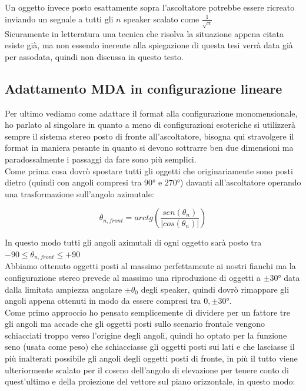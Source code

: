 \documentclass[12pt,a4paper]{report}
\begin{document}
Un oggetto invece posto esattamente sopra l'ascoltatore potrebbe essere ricreato inviando un segnale a tutti gli $n$ speaker scalato come $\frac{1}{\sqrt{n}}$\\

Sicuramente in letteratura una tecnica che risolva la situazione appena citata esiste già, ma non essendo inerente alla spiegazione di questa tesi verrà data già per assodata, quindi non discussa in questo testo.

\subsection{Adattamento MDA in configurazione	 lineare}

Per ultimo vediamo come adattare il format alla configurazione monomensionale, ho parlato al singolare in quanto a meno di configurazioni esoteriche si utilizzerà sempre il sistema stereo posto di fronte all'ascoltatore, bisogna qui stravolgere il format in maniera pesante in quanto si devono sottrarre ben due dimensioni ma paradossalmente i passaggi da fare sono più semplici.\\ 

Come prima cosa dovrò spostare tutti gli oggetti che originariamente sono posti dietro (quindi con angoli compresi tra $90°$ e $270°$) davanti all'ascoltatore operando una trasformazione sull'angolo azimutale:

\begin{equation}
\theta_{n,front} = arctg  \left( \dfrac{sen(\theta_n)}{\vert cos(\theta_n)\vert } \right)
\label{llll}
\end{equation}

In questo modo tutti gli angoli azimutali di ogni oggetto sarà posto tra $-90 \leq \theta_{n,front} \leq +90$\\

Abbiamo ottenuto oggetti posti al massimo perfettamente ai nostri fianchi ma la configurazione stereo prevede al massimo una riproduzione di oggetti a $\pm 30°$ data dalla limitata ampiezza angolare $\pm \theta_0$ degli speaker, quindi dovrò rimappare gli angoli appena ottenuti in modo da essere compresi tra $0, \pm 30°$.\\ 

Come primo approccio ho pensato semplicemente di dividere per un fattore tre gli angoli ma accade che gli oggetti posti sullo scenario frontale vengono schiacciati troppo verso l'origine degli angoli, quindi ho optato per la funzione seno (usata come peso) che schiacciasse gli oggetti posti sui lati e che lasciasse il più inalterati possibile gli angoli degli oggetti posti di fronte, in più il tutto viene ulteriormente scalato per il coseno dell'angolo di elevazione per tenere conto di quest'ultimo e della proiezione del vettore sul piano orizzontale, in questo modo:
\end{document}
